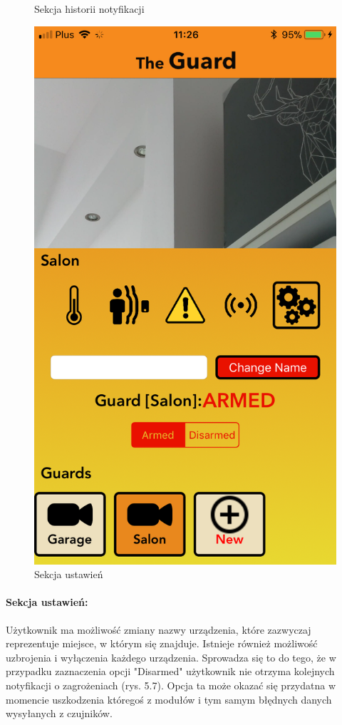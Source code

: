 \begin{figure}[ht]
\begin{minipage}{.4\linewidth}
    \caption{Sekcja historii notyfikacji}
    \label{img1}
\end{minipage}
\hspace{.05\linewidth}
\begin{minipage}{.4\linewidth}
    \includegraphics[width=\linewidth]{settings.png}
    \caption{Sekcja ustawień}
    \label{img2}
\end{minipage}
\end{figure} 
\paragraph{Sekcja ustawień:}
Użytkownik ma możliwość zmiany nazwy urządzenia, które zazwyczaj reprezentuje miejsce, w którym się znajduje. Istnieje również możliwość uzbrojenia i wyłączenia każdego urządzenia. Sprowadza się to do tego, że w przypadku zaznaczenia opcji "Disarmed" użytkownik nie otrzyma kolejnych notyfikacji o zagrożeniach (rys. 5.7). Opcja ta może okazać się przydatna w momencie uszkodzenia któregoś z modułów i tym samym błędnych danych wysyłanych z czujników.
